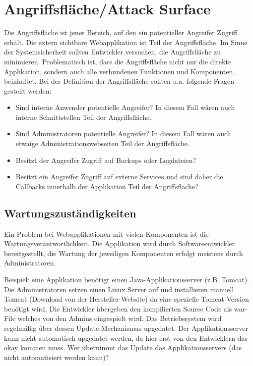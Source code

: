 \section{Angriffsfläche/Attack Surface}

Die Angriffsfläche ist jener Bereich, auf den ein potentieller Angreifer Zugriff erhält. Die extern sichtbare Webapplikation ist Teil der Angriffsfläche. Im Sinne der Systemsicherheit sollten Entwickler versuchen, die Angriffsfläche zu minimieren. Problematisch ist, dass die Angriffsfläche nicht nur die direkte Applikation, sondern auch alle verbundenen Funktionen und Komponenten, beinhaltet. Bei der Definition der Angriffsfläche sollten u.a. folgende Fragen gestellt werden: 

\begin{itemize}
	\item Sind interne Anwender potentielle Angreifer? In diesem Fall wären auch interne Schnittstellen Teil der Angriffsfläche.
	\item Sind Administratoren potentielle Angreifer? In diesem Fall wären auch etwaige Administrationswebseiten Teil der Angriffsfläche.
	\item Besitzt der Angreifer Zugriff auf Backups oder Logdateien?
	\item Besitzt ein Angreifer Zugriff auf externe Services und sind daher die Callbacks innerhalb der Applikation Teil der Angriffsfläche?
\end{itemize}

\subsection{Wartungszuständigkeiten}

Ein Problem bei Webapplikationen mit vielen Komponenten ist die Wartungsverantwortlichkeit. Die Applikation wird durch Softwareentwickler bereitgestellt, die Wartung der jeweiligen Komponenten erfolgt meistens durch Administratoren.

Beispiel: eine Applikation benötigt einen Java-Applikationsserver (z.B. Tomcat). Die Administratoren setzen einen Linux Server auf und installieren manuell Tomcat (Download von der Hersteller-Website) da eine spezielle Tomcat Version benötigt wird. Die Entwickler übergeben den kompilierten Source Code als war-File welches von den Admins eingespielt wird. Das Betriebssystem wird regelmäßig über dessen Update-Mechanismus upgedatet. Der Applikationsserver kann nicht automatisch upgedatet werden, da hier erst von den Entwicklern das okay kommen muss. Wer übernimmt das Update das Applikationsservers (das nicht automatisiert werden kann)?

